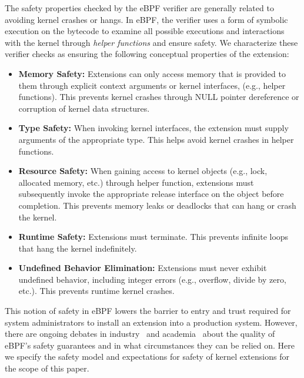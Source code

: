 The safety properties checked by the eBPF verifier are generally
related to avoiding kernel crashes or hangs.  In eBPF, the verifier
uses a form of symbolic execution on the bytecode to examine all
possible executions and interactions with the kernel through {\em
  helper functions} and ensure safety.  We characterize these verifier
checks as ensuring the following conceptual properties of the
extension: 
\begin{itemize}
\item {\bf Memory Safety:} Extensions can only access memory that is
  provided to them through explicit context arguments or kernel
  interfaces, (e.g., helper functions).  This prevents kernel crashes
  through NULL pointer dereference or corruption of kernel data
  structures.
\item {\bf Type Safety:} When invoking kernel interfaces, the
  extension must supply arguments of the appropriate type.  This helps
  avoid kernel crashes in helper functions.
\item {\bf Resource Safety:} When gaining access to kernel objects
  (e.g., lock, allocated memory, etc.) through helper function,
  extensions must subsequently invoke the appropriate release
  interface on the object before completion.  This prevents memory
  leaks or deadlocks that can hang or crash the kernel.
\item {\bf Runtime Safety:} Extensions must terminate. This prevents
  infinite loops that hang the kernel indefinitely.
\item {\bf Undefined Behavior Elimination:} Extensions must never
  exhibit undefined behavior, including integer errors (e.g.,
  overflow, divide by zero, etc.). This prevents runtime kernel
  crashes.
\end{itemize}

This notion of safety in eBPF lowers the barrier to entry and trust
required for system administrators to install an extension into a
production system.  However, there are ongoing debates in
industry~\cite{unprivileged-ebpf} and
academia~\cite{untenableVerification} about the quality of eBPF's
safety guarantees and in what circumstances they can be relied on.
Here we specify the safety model and expectations for safety of kernel
extensions for the scope of this paper.

